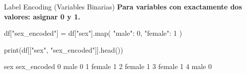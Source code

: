\documentclass[aspectratio=169, 11pt]{beamer}
\begin{document}
\begin{frame}[fragile,shrink=28]{Label Encoding (Variables Binarias)}
  \vspace{-6pt}
  {\footnotesize\color{arcaDark}\bfseries
    Para variables con exactamente dos valores: asignar 0 y 1.}

  \vspace{4pt}
  \begin{pyblock}
df["sex_encoded"] = df["sex"].map({
    "male": 0,
    "female": 1
})

print(df[["sex", "sex_encoded"]].head())
  \end{pyblock}

  \vspace{4pt}
  \begin{outputblock}
      sex  sex_encoded
0    male            0
1  female            1
2  female            1
3  female            1
4    male            0
  \end{outputblock}
\end{frame}
\end{document}
